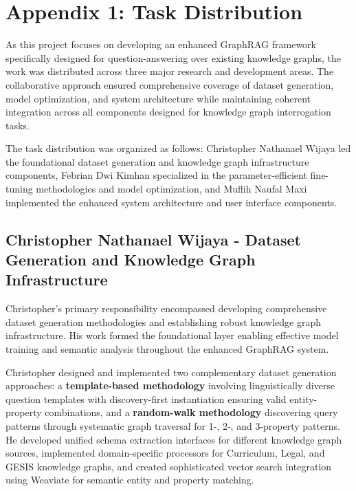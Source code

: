 \chapter*{Appendix 1: Task Distribution}
\label{sec:task-dist}

As this project focuses on developing an enhanced GraphRAG framework specifically designed for question-answering over existing knowledge graphs, the work was distributed across three major research and development areas. The collaborative approach ensured comprehensive coverage of dataset generation, model optimization, and system architecture while maintaining coherent integration across all components designed for knowledge graph interrogation tasks.

The task distribution was organized as follows: Christopher Nathanael Wijaya led the foundational dataset generation and knowledge graph infrastructure components, Febrian Dwi Kimhan specialized in the parameter-efficient fine-tuning methodologies and model optimization, and Muflih Naufal Maxi implemented the enhanced system architecture and user interface components.

\section*{Christopher Nathanael Wijaya - Dataset Generation and Knowledge Graph Infrastructure}

Christopher's primary responsibility encompassed developing comprehensive dataset generation methodologies and establishing robust knowledge graph infrastructure. His work formed the foundational layer enabling effective model training and semantic analysis throughout the enhanced GraphRAG system.

Christopher designed and implemented two complementary dataset generation approaches: a \textbf{template-based methodology} involving linguistically diverse question templates with discovery-first instantiation ensuring valid entity-property combinations, and a \textbf{random-walk methodology} discovering query patterns through systematic graph traversal for 1-, 2-, and 3-property patterns. He developed unified schema extraction interfaces for different knowledge graph sources, implemented domain-specific processors for Curriculum, Legal, and GESIS knowledge graphs, and created sophisticated vector search integration using Weaviate for semantic entity and property matching.

